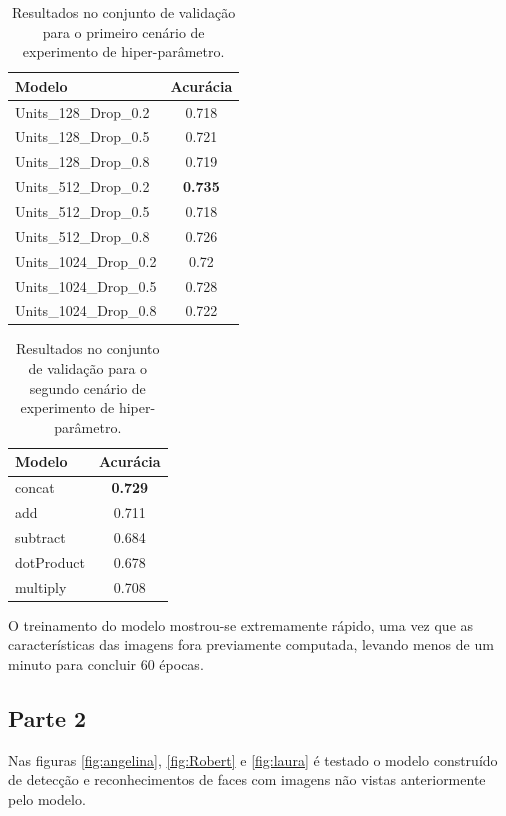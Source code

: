 \documentclass{bmvc2k}
\begin{document}
\begin{table}[htb]
    \small
    \centering
    \begin{tabular}{|l|c|}
        \hline
        Modelo & Acurácia \\
        \hline
        Units\_128\_Drop\_0.2 & 0.718 \\
        Units\_128\_Drop\_0.5 & 0.721 \\
        Units\_128\_Drop\_0.8 & 0.719 \\
        Units\_512\_Drop\_0.2 & \textbf{0.735} \\
        Units\_512\_Drop\_0.5 & 0.718 \\
        Units\_512\_Drop\_0.8 & 0.726 \\
        Units\_1024\_Drop\_0.2 & 0.72 \\
        Units\_1024\_Drop\_0.5 & 0.728 \\
        Units\_1024\_Drop\_0.8 & 0.722 \\
        \hline
    \end{tabular}
    \caption{Resultados no conjunto de validação para o primeiro cenário de experimento de hiper-parâmetro.}
    \label{tab:dropunit}
\end{table}

\begin{table}[htb]
    \small
    \centering
    \begin{tabular}{|l|c|}
        \hline
        Modelo & Acurácia \\
        \hline
        concat & \textbf{0.729} \\
        add & 0.711 \\
        subtract & 0.684 \\
        dotProduct & 0.678 \\
        multiply & 0.708 \\
        \hline

    \end{tabular}
    \caption{Resultados no conjunto de validação para o segundo cenário de experimento de hiper-parâmetro.}
    \label{tab:merge}
\end{table}

O treinamento do modelo mostrou-se extremamente rápido, uma vez que as características das imagens fora previamente computada, levando menos de um minuto para concluir 60 épocas.

\subsection{Parte 2}
Nas figuras \ref{fig:angelina}, \ref{fig:Robert} e \ref{fig:laura} é testado o modelo construído de detecção e reconhecimentos de faces com imagens não vistas anteriormente pelo modelo.
\end{document}
